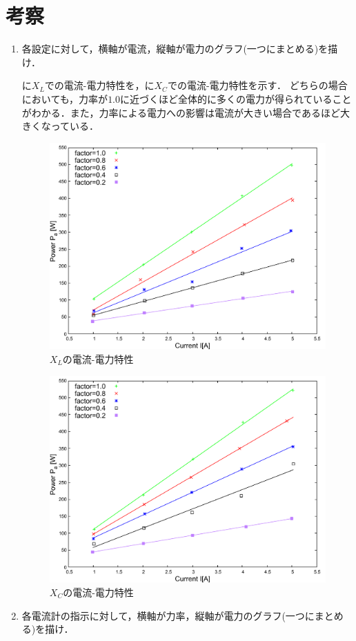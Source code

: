 \clearpage
\section{考察}
\begin{enumerate}[1.)]
	\item 各設定に対して，横軸が電流，縦軸が電力のグラフ(一つにまとめる)を描け．
	
	に$X_{L}$での電流-電力特性を，に$X_{C}$での電流-電力特性を示す．
	どちらの場合においても，力率が$1.0$に近づくほど全体的に多くの電力が得られていることがわかる．また，力率による電力への影響は電流が大きい場合であるほど大きくなっている．
	\begin{figure}[h]
	\centering
	\includegraphics[scale=0.6]{./data/L/L.pdf}
	\caption{$X_L$の電流-電力特性}
	\label{fig:L}
	\end{figure}
	\begin{figure}[h]
	\centering
	\includegraphics[scale=0.6]{./data/C/C.pdf}
	\caption{$X_C$の電流-電力特性}
	\label{fig:C}
	\end{figure}
	\item 各電流計の指示に対して，横軸が力率，縦軸が電力のグラフ(一つにまとめる)を描け．
	

\end{enumerate}
